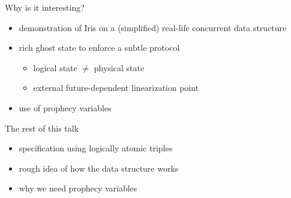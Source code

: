 \begin{frame}{Why is it interesting?}
\begin{itemize}
	\item demonstration of Iris on a (simplified) real-life concurrent data structure
	\item rich ghost state to enforce a subtle protocol
		\begin{itemize}
			\item logical state $\neq$ physical state
			\item external future-dependent linearization point
		\end{itemize}
	\item use of prophecy variables
\end{itemize}
\end{frame}

\begin{frame}{The rest of this talk}
\begin{itemize}
	\item specification using logically atomic triples
	\item rough idea of how the data structure works
	\item why we need prophecy variables
\end{itemize}
\end{frame}